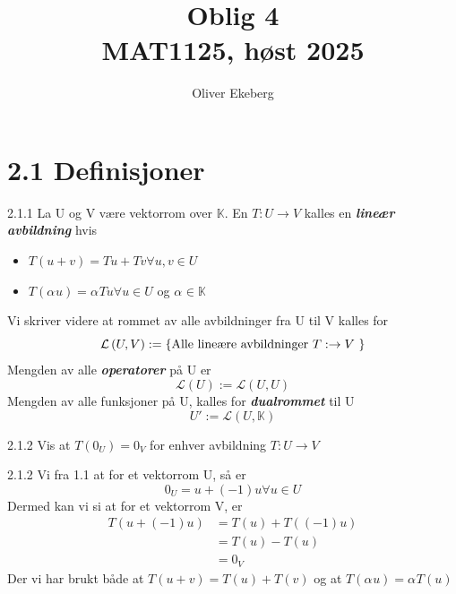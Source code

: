 \documentclass[a4paper,norsk]{article}
\title{Oblig 4 \\ MAT1125, høst 2025}
\author{Oliver Ekeberg}
\begin{document}
\maketitle

\tableofcontents

\section*{2.1 Definisjoner}

\begin{definitionbox}{2.1.1}{}
La U og V være vektorrom over $ \mathbb{K} $. En $ T: U \rightarrow V $ kalles en \textbf{\textit{lineær avbildning}} hvis 
\begin{itemize}
    \item $ T \left( u + v \right) = T u + Tv \forall u, v \in U $ 
    \item $ T \left( \alpha_{}^{} u \right) = \alpha_{}^{} T u \forall u \in  U $ og $ \alpha_{}^{} \in \mathbb{K} $  
\end{itemize}

Vi skriver videre at rommet av alle avbildninger fra U til V kalles for
\[
    \mathcal{L} \left( U, V \right) := \left\{ \text{Alle lineære avbildninger $ T: \rightarrow V $ } \right\} 
\]
Mengden av alle \textbf{\textit{operatorer}} på U er 
\[
    \mathcal{L} \left( U \right) := \mathcal{L} \left( U, U \right) 
\]
Mengden av alle funksjoner på U, kalles for \textbf{\textit{dualrommet}} til U
\[
    U' := \mathcal{L} \left( U, \mathbb{K} \right) 
\]
\end{definitionbox}

\begin{oppgavebox}{2.1.2}{}
Vis at $ T \left( 0_U \right) = 0_V  $ for enhver avbildning $ T: U \rightarrow V $ 

\begin{proofbox}{2.1.2}{}
Vi fra 1.1 at for et vektorrom U, så er
\[
    0_U = u + \left( -1 \right) u \forall u \in U
\]
Dermed kan vi si at for et vektorrom V, er
\begin{align*}
    T \left( u + \left( -1 \right) u \right) &= T \left( u \right) + T \left( \left( -1 \right) u \right) \\
    &= T \left( u \right) - T \left( u \right) \\
    &= 0_V
\end{align*}
Der vi har brukt både at $ T \left( u + v  \right) = T \left( u \right) + T \left( v \right)  $ og at $ T \left( \alpha_{}^{} u \right) = \alpha_{}^{} T \left( u \right)  $  
\end{proofbox}
\end{oppgavebox}
\end{document}
